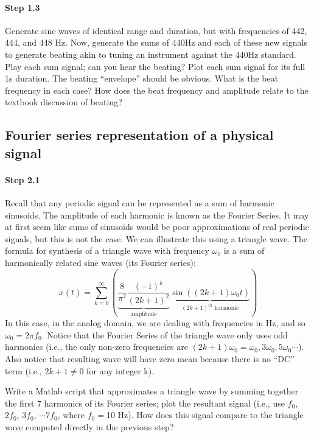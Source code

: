 \paragraph{Step 1.3} Generate sine waves of identical range and
duration, but with frequencies of 442, 444, and 448 Hz. Now, generate
the sums of 440Hz and each of these new signals to generate beating
akin to tuning an instrument against the 440Hz standard. Play each sum
signal; can you hear the beating? Plot each sum signal for its full 1s
duration. The beating ``envelope'' should be obvious. What is the beat
frequency in each case? How does the beat frequency and amplitude
relate to the textbook discussion of beating?


\subsection{Fourier series representation of a physical signal}


\paragraph{Step 2.1} Recall that any periodic signal can be
represented as a sum of harmonic sinusoids.  The amplitude of each
harmonic is known as the Fourier Series. It may at first seem like
sums of sinusoids would be poor approximations of real periodic
signals, but this is not the case. We can illustrate this using a
triangle wave. The formula for synthesis of a triangle wave with
frequency $\omega_0$ is a sum of harmonically related sine waves (its
Fourier series):
  \[
  x(t) = \sum_{k=0}^{\infty}
  \left( 
    \underbrace{ \frac{8}{\pi^2} \frac{(-1)^k}{(2k+ 1)^2} }_{ \text{amplitude} } 
    \underbrace{ \sin((2k+1)\omega_0 t) }_{ (2k+1)^{th}\text{ harmonic} } 
  \right)
  \]
  In this case, in the analog domain, we are dealing with frequencies
  in Hz, and so $\omega_0 = 2\pi f_0$. Notice that the Fourier Series
  of the triangle wave only uses odd harmonics (i.e., the only
  non-zero frequencies are $(2k+1)\omega_0=\omega_0, 3\omega_0,
  5\omega_0 \cdots$). Also notice that resulting wave will have zero
  mean because there is no ``DC'' term (i.e., $2k+1 \neq 0$ for any
  integer k).

  Write a Matlab script that approximates a triangle wave by summing
  together the first 7 harmonics of its Fourier series; plot the
  resultant signal (i.e., use $f_0$, $2f_0$, $3f_0$, $\cdots 7f_0$,
  where $f_0=$10 Hz). How does this signal compare to the triangle
  wave computed directly in the previous step?



